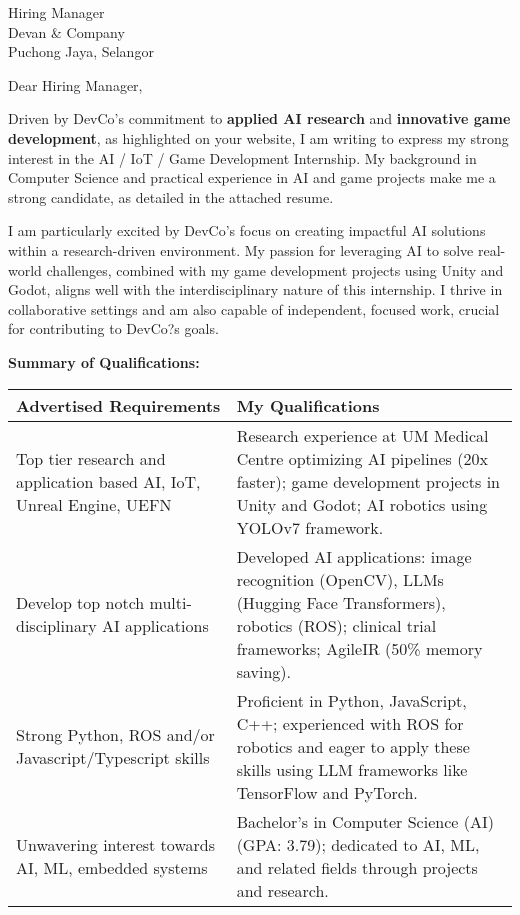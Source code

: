 \documentclass[10.5pt]{letter}
\date{\today}
\begin{document}
\begin{letter}{Hiring Manager\\
Devan \& Company\\
Puchong Jaya, Selangor}

\opening{Dear Hiring Manager,}

Driven by DevCo's commitment to \textbf{applied AI research} and \textbf{innovative game development}, as highlighted on your website, I am writing to express my strong interest in the AI / IoT / Game Development Internship. My background in Computer Science and practical experience in AI and game projects make me a strong candidate, as detailed in the attached resume.

I am particularly excited by DevCo's focus on creating impactful AI solutions within a research-driven environment. My passion for leveraging AI to solve real-world challenges, combined with my game development projects using Unity and Godot, aligns well with the interdisciplinary nature of this internship. I thrive in collaborative settings and am also capable of independent, focused work, crucial for contributing to DevCo?s goals.

\vspace{0.3cm}
\textbf{Summary of Qualifications:}
\vspace{0.2cm}

\renewcommand{\arraystretch}{1.3}
\begin{tabularx}{\textwidth}{@{}p{}X@{}}
\textbf{Advertised Requirements} & \textbf{My Qualifications} \\

\hline
Top tier research and application based AI, IoT, Unreal Engine, UEFN & Research experience at UM Medical Centre optimizing AI pipelines (20x faster); game development projects in Unity and Godot; AI robotics using YOLOv7 framework. \\

Develop top notch multi-disciplinary AI applications & Developed AI applications: image recognition (OpenCV), LLMs (Hugging Face Transformers), robotics (ROS); clinical trial frameworks; AgileIR (50\% memory saving). \\

Strong Python, ROS and/or Javascript/Typescript skills & Proficient in Python, JavaScript, C++; experienced with ROS for robotics and eager to apply these skills using LLM frameworks like TensorFlow and PyTorch. \\

Unwavering interest towards AI, ML, embedded systems & Bachelor's in Computer Science (AI) (GPA: 3.79); dedicated to AI, ML, and related fields through projects and research. \\


\end{tabularx}
\end{letter}
\end{document}
